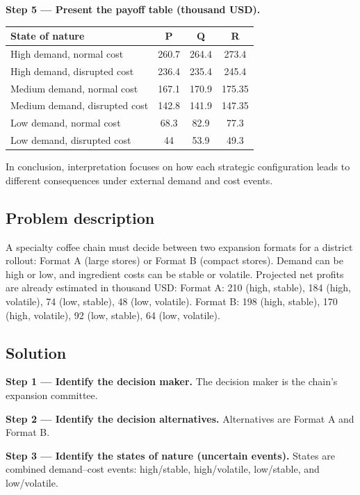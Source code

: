\begin{ExamProblems}
		\textbf{Step 5 --- Present the payoff table (thousand USD).}
		\begin{center}
			\begin{tabular}{l c c c}
				\toprule
				State of nature & P & Q & R \\
				\midrule
				High demand, normal cost & 260.7 & 264.4 & 273.4 \\
				High demand, disrupted cost & 236.4 & 235.4 & 245.4 \\
				Medium demand, normal cost & 167.1 & 170.9 & 175.35 \\
				Medium demand, disrupted cost & 142.8 & 141.9 & 147.35 \\
				Low demand, normal cost & 68.3 & 82.9 & 77.3 \\
				Low demand, disrupted cost & 44 & 53.9 & 49.3 \\
				\bottomrule
			\end{tabular}
		\end{center}
		
		In conclusion, interpretation focuses on how each strategic configuration leads to different consequences under external demand and cost events.
		
		\item
		\subsection*{Problem description}
		A specialty coffee chain must decide between two expansion formats for a district rollout:
		Format A (large stores) or Format B (compact stores).
		Demand can be high or low, and ingredient costs can be stable or volatile.
		Projected net profits are already estimated in thousand USD:
		Format A: 210 (high, stable), 184 (high, volatile), 74 (low, stable), 48 (low, volatile).
		Format B: 198 (high, stable), 170 (high, volatile), 92 (low, stable), 64 (low, volatile).
		
		\subsection*{Solution}
		\textbf{Step 1 --- Identify the decision maker.} The decision maker is the chain's expansion committee.
		
		\textbf{Step 2 --- Identify the decision alternatives.} Alternatives are Format A and Format B.
		
		\textbf{Step 3 --- Identify the states of nature (uncertain events).} States are combined demand--cost events: high/stable, high/volatile, low/stable, and low/volatile.
		

\end{ExamProblems}
